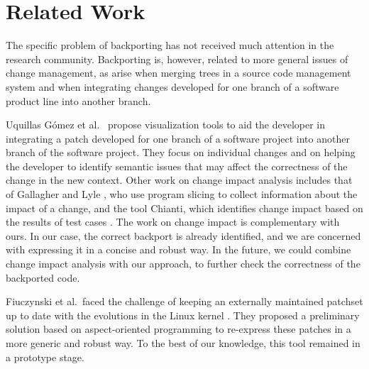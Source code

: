 \section{Related Work}
\label{related}

The specific problem of backporting has not received much attention in the
research community.  Backporting is, however, related to more general
issues of change management, as arise when merging trees in a source code
management system and when integrating changes developed for one branch of
a software product line into another branch.

Uquillas G\'omez et al.~\cite{UquillasGomez:wcre10} propose visualization
tools to aid the developer in integrating a patch developed for one branch
of a software project into another branch of the software project.  They
focus on individual changes and on helping the developer to identify semantic
issues that may affect the correctness of the change in the new context.
Other work on change impact analysis includes that of Gallagher and Lyle
\cite{Gall91a}, who use program slicing \cite{Weis81a} to collect
information about the impact of a change, and the tool Chianti, which
identifies change impact based on the results of test cases \cite{Ren04a}.
The work on change impact is complementary with ours.  In our case, the
correct backport is already identified, and we are concerned with expressing
it in a concise and robust way.  In the future, we could combine change
impact analysis with our approach, to further check the correctness of the
backported code.

Fiuczynski et al.\ faced the challenge of keeping an externally maintained
patchset up to date with the evolutions in the Linux kernel
\cite{Fiuczynski:hotos05}.  They proposed a preliminary solution based on
aspect-oriented programming \cite{Kiczales:01} to re-express these patches
in a more generic and robust way.  To the best of our knowledge, this tool
remained in a prototype stage.
